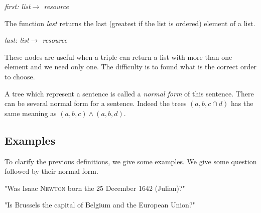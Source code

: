 \begin{center}
\textsl{first: list$\rightarrow$ resource}
\end{center}

The function \textsl{last} returns the last (greatest if the list is ordered) element of a list.

\begin{center}
\textsl{last: list$\rightarrow$ resource}
\end{center}

These nodes are useful when a triple can return a list with more than one element and we need only one. The difficulty is to found what is the correct order to choose.

\bigskip

A tree which represent a sentence is called a \emph{normal form} of this sentence. There can be several normal form for a sentence. Indeed the trees $(a,b,c\cap d)$ has the same meaning as $(a,b,c)\wedge(a,b,d)$.

\subsection{Examples}

To clarify the previous definitions, we give some examples. We give some question followed by their normal form.

\FloatBarrier
\bigskip

"Was Isaac \textsc{Newton} born the 25 December 1642 (Julian)?"

\begin{figure}[!ht]
    \centering
\end{figure}

\FloatBarrier
\bigskip

"Is Brussels the capital of Belgium and the European Union?"

